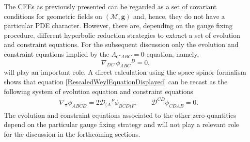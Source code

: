\documentclass[10pt,a4paper]{article}
\theoremstyle{plain}
\def\bmg{{\bm g}}
\newcounter{mnotecount}%
\newcommand{\mnotex}[1]%
{\protect{\stepcounter{mnotecount}}$^{\mbox{\footnotesize $\bullet$\themnotecount}}$ 
\marginpar{%
\raggedright\tiny\em
$\!\!\!\!\!\!\,\bullet$\themnotecount: #1} }
\begin{document}
The CFEs as previously presented can be regarded as a set of covariant
conditions for geometric fields on $(\mathcal{M},\bmg)$ and, hence,
they do not have a particular PDE character.  However, there are,
depending on the gauge fixing procedure, different hyperbolic
reduction strategies to extract a set of evolution and constraint
equations.  For the subsequent discussion only the evolution and
constraint equations implied by the $\Lambda_{C'ABC}=0$ equation, namely,
\begin{equation}\label{RescaledWeylEquationDisplayed}
 \nabla_{DC'}\phi _{ABC}{}^{D}=0,
\end{equation}
will play an important role.  A direct calculation using
the space spinor formalism
shows that equation \eqref{RescaledWeylEquationDisplayed}
can be recast as the following system
of evolution equation and constraint equations
\begin{align}\label{RescaledWeyl_evo_const}
  & \nabla_{\bm\tau} \phi _{ABCD} = 2 \mathcal{D} _{(A}{}^{F}\phi_{BCD)F},
  \qquad \mathcal{D} ^{CD}\phi _{CDAB} = 0.
\end{align}
The evolution and constraint equations associated to the other
zero-quantities depend on the particular gauge fixing strategy and
will not play a relevant role for the discussion in the forthcoming
sections.

\medskip
\end{document}
